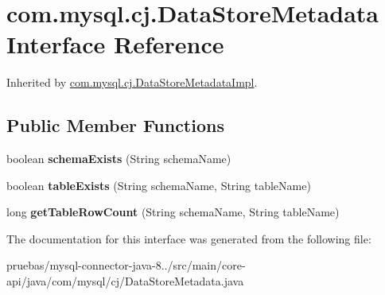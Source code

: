 \hypertarget{interfacecom_1_1mysql_1_1cj_1_1_data_store_metadata}{}\section{com.\+mysql.\+cj.\+Data\+Store\+Metadata Interface Reference}
\label{interfacecom_1_1mysql_1_1cj_1_1_data_store_metadata}


Inherited by \mbox{\hyperlink{classcom_1_1mysql_1_1cj_1_1_data_store_metadata_impl}{com.\+mysql.\+cj.\+Data\+Store\+Metadata\+Impl}}.

\subsection*{Public Member Functions}
\begin{DoxyCompactItemize}
\item 
\mbox{\label{interfacecom_1_1mysql_1_1cj_1_1_data_store_metadata_a84e051d687ac64b12284d1108299ddd2}} 
boolean {\bfseries schema\+Exists} (String schema\+Name)
\item 
\mbox{\label{interfacecom_1_1mysql_1_1cj_1_1_data_store_metadata_aa5f40f6700b0a10a53ef81b8481b34be}} 
boolean {\bfseries table\+Exists} (String schema\+Name, String table\+Name)
\item 
\mbox{\label{interfacecom_1_1mysql_1_1cj_1_1_data_store_metadata_a32914475145214a820abf505afcaa2fd}} 
long {\bfseries get\+Table\+Row\+Count} (String schema\+Name, String table\+Name)
\end{DoxyCompactItemize}


The documentation for this interface was generated from the following file\+:\begin{DoxyCompactItemize}
\item 
pruebas/mysql-\/connector-\/java-\/8../src/main/core-\/api/java/com/mysql/cj/Data\+Store\+Metadata.\+java\end{DoxyCompactItemize}
